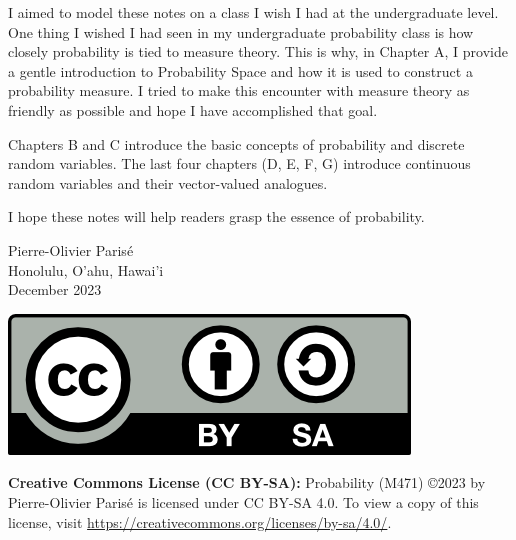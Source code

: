 I aimed to model these notes on a class I wish I had at the undergraduate level. One thing I wished I had seen in my undergraduate probability class is how closely probability is tied to measure theory. This is why, in Chapter A, I provide a gentle introduction to Probability Space and how it is used to construct a probability measure. I tried to make this encounter with measure theory as friendly as possible and hope I have accomplished that goal.

Chapters B and C introduce the basic concepts of probability and discrete random variables. The last four chapters (D, E, F, G) introduce continuous random variables and their vector-valued analogues. 

I hope these notes will help readers grasp the essence of probability.

\vspace*{1cm}

\begin{flushright}
Pierre-Olivier Paris{\'e}\\
Honolulu, O'ahu, Hawai'i \\
December 2023 
\end{flushright}

\vfill 

\includegraphics[scale=1]{CC-BY-SA.png}

\textbf{Creative Commons License (CC BY-SA):}   Probability (M471) \copyright 2023 by Pierre-Olivier Parisé is licensed under CC BY-SA 4.0. To view a copy of this license, visit \url{https://creativecommons.org/licenses/by-sa/4.0/}.

\newpage 

{}
\tableofcontents

\thispagestyle{empty}

\newpage





